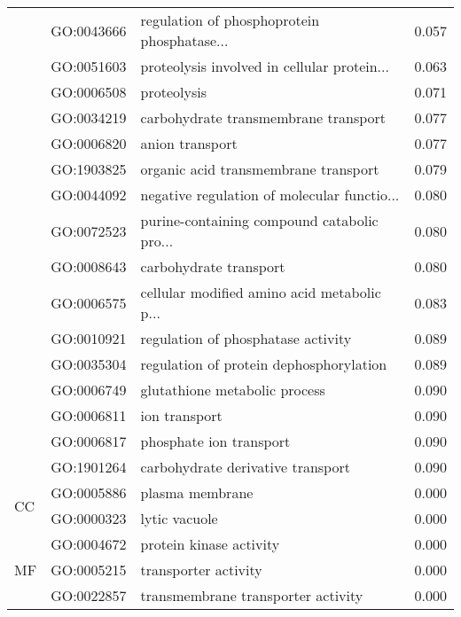 \begin{longtable}{lllr}
   & GO:0043666 &  regulation of phosphoprotein phosphatase... &         0.057 \\
   & GO:0051603 &  proteolysis involved in cellular protein... &         0.063 \\
   & GO:0006508 &                                  proteolysis &         0.071 \\
   & GO:0034219 &         carbohydrate transmembrane transport &         0.077 \\
   & GO:0006820 &                              anion transport &         0.077 \\
   & GO:1903825 &         organic acid transmembrane transport &         0.079 \\
   & GO:0044092 &  negative regulation of molecular functio... &         0.080 \\
   & GO:0072523 &  purine-containing compound catabolic pro... &         0.080 \\
   & GO:0008643 &                       carbohydrate transport &         0.080 \\
   & GO:0006575 &  cellular modified amino acid metabolic p... &         0.083 \\
   & GO:0010921 &           regulation of phosphatase activity &         0.089 \\
   & GO:0035304 &      regulation of protein dephosphorylation &         0.089 \\
   & GO:0006749 &                glutathione metabolic process &         0.090 \\
   & GO:0006811 &                                ion transport &         0.090 \\
   & GO:0006817 &                      phosphate ion transport &         0.090 \\
   & GO:1901264 &            carbohydrate derivative transport &         0.090 \\
\cline{1-4}
\multirow{2}{*}{CC} & GO:0005886 &                              plasma membrane &         0.000 \\
   & GO:0000323 &                                lytic vacuole &         0.000 \\
\cline{1-4}
\multirow{64}{*}{MF} & GO:0004672 &                      protein kinase activity &         0.000 \\
   & GO:0005215 &                         transporter activity &         0.000 \\
   & GO:0022857 &           transmembrane transporter activity &         0.000 \\

\end{longtable}
